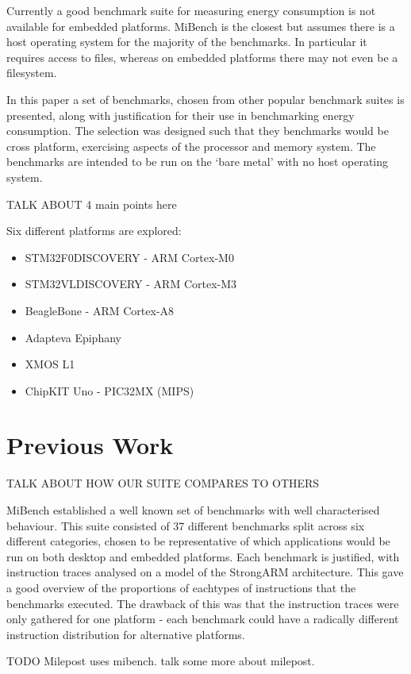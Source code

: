 \documentclass[twocolumn]{article}
\begin{document}
Currently a good benchmark suite for measuring energy consumption is not available for embedded platforms. MiBench is the closest but assumes there is a host operating system for the majority of the benchmarks. In particular it requires access to files, whereas on embedded platforms there may not even be a filesystem.

In this paper a set of benchmarks, chosen from other popular benchmark suites is presented, along with justification for their use in benchmarking energy consumption. The selection was designed such that they benchmarks would be cross platform, exercising aspects of the processor and memory system. The benchmarks are intended to be run on the ‘bare metal’ with no host operating system.

TALK ABOUT 4 main points here

Six different platforms are explored:
\begin{itemize}
	\item STM32F0DISCOVERY - ARM Cortex-M0
	\item STM32VLDISCOVERY - ARM Cortex-M3
	\item BeagleBone - ARM Cortex-A8
	\item Adapteva Epiphany
	\item XMOS L1
	\item ChipKIT Uno - PIC32MX (MIPS)
\end{itemize}

\section*{Previous Work}

TALK ABOUT HOW OUR SUITE COMPARES TO OTHERS

MiBench established a well known set of benchmarks with well characterised behaviour. This suite consisted of 37 different benchmarks split across six different categories, chosen to be representative of which applications would be run on both desktop and embedded platforms. Each benchmark is justified, with instruction traces analysed on a model of the StrongARM architecture. This gave a good overview of the proportions of eachtypes of instructions that the benchmarks executed. The drawback of this was that the instruction traces were only gathered for one platform - each benchmark could have a radically different instruction distribution for alternative platforms.

TODO Milepost uses mibench. talk some more
about milepost.
\end{document}
